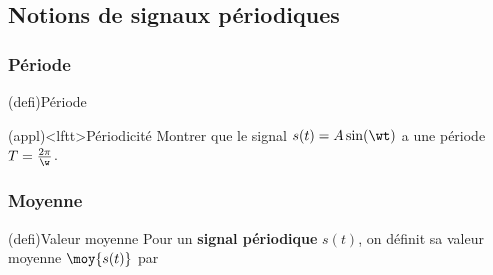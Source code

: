 \documentclass[../../main/main.tex]{subfiles}
\begin{document}
\vspace{-10pt}
\subsection{Notions de signaux périodiques}
\subsubsection{Période}
\begin{tcb}(defi){Période}
	\psw{%
		\[
			s(t) \quad \text{périodique}
			\equiv
			\exists T~: \forall t \in \Rb^{+}, s(t+T) = s(t)
		\]
	}%
	\vspace{-15pt}
\end{tcb}
\begin{tcb}(appl)<lftt>{Périodicité}
	Montrer que le signal $s(t) = A \sin(\wt)$ a une période $T =
		\frac{2\pi}{\w}$.
	\tcblower
	\psw{%
		\[
			s \left( t + \frac{2\pi}{\w} \right) =
			A \left( \w \left( t + \frac{2\pi}{\w} \right) \right) =
			A \sin(\wt + 2\pi) = A \sin(\wt)
			\qed
		\]
	}%
	\vspace{-15pt}
\end{tcb}

\subsubsection{Moyenne}
\begin{tcb}(defi){Valeur moyenne}
	Pour un \textbf{signal périodique} $s(t)$, on définit sa valeur moyenne
	$\moy{s(t)}$ par
	\psw{%
		\[
			\moy{s(t)} = \frac{1}{T}\int _{0}^{T} s(t) \dd{t}
		\]
	}%
	\vspace{-15pt}
\end{tcb}
\end{document}
